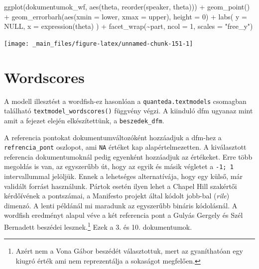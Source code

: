 \documentclass[
]{book}
\newenvironment{Shaded}{\begin{snugshade}}{\end{snugshade}}
\newcommand{\AttributeTok}[1]{\textcolor[rgb]{0.77,0.63,0.00}{#1}}
\newcommand{\ConstantTok}[1]{\textcolor[rgb]{0.00,0.00,0.00}{#1}}
\newcommand{\DecValTok}[1]{\textcolor[rgb]{0.00,0.00,0.81}{#1}}
\newcommand{\FunctionTok}[1]{\textcolor[rgb]{0.00,0.00,0.00}{#1}}
\newcommand{\NormalTok}[1]{#1}
\newcommand{\SpecialCharTok}[1]{\textcolor[rgb]{0.00,0.00,0.00}{#1}}
\newcommand{\StringTok}[1]{\textcolor[rgb]{0.31,0.60,0.02}{#1}}
\begin{document}
\begin{Shaded}
\begin{Highlighting}[]
\FunctionTok{ggplot}\NormalTok{(dokumentumok\_wf, }\FunctionTok{aes}\NormalTok{(theta, }\FunctionTok{reorder}\NormalTok{(speaker, theta))) }\SpecialCharTok{+}
  \FunctionTok{geom\_point}\NormalTok{() }\SpecialCharTok{+}
  \FunctionTok{geom\_errorbarh}\NormalTok{(}\FunctionTok{aes}\NormalTok{(}\AttributeTok{xmin =}\NormalTok{ lower, }\AttributeTok{xmax =}\NormalTok{ upper), }\AttributeTok{height =} \DecValTok{0}\NormalTok{) }\SpecialCharTok{+}
  \FunctionTok{labs}\NormalTok{(}
    \AttributeTok{y =} \ConstantTok{NULL}\NormalTok{,}
    \AttributeTok{x =} \FunctionTok{expression}\NormalTok{(theta)}
\NormalTok{  ) }\SpecialCharTok{+}
  \FunctionTok{facet\_wrap}\NormalTok{(}\SpecialCharTok{\textasciitilde{}}\NormalTok{part, }\AttributeTok{ncol =} \DecValTok{1}\NormalTok{, }\AttributeTok{scales =} \StringTok{"free\_y"}\NormalTok{)}
\end{Highlighting}
\end{Shaded}

\begin{center}\texttt{[image: \_main\_files/figure-latex/unnamed-chunk-151-1]} \end{center}

\hypertarget{wordscores}{%
\section{Wordscores}\label{wordscores}}

A modell illesztést a wordfish-ez hasonlóan a
\texttt{quanteda.textmodels} csomagban található
\texttt{textmodel\_wordscores()} függvény végzi. A kiinduló dfm ugyanaz
mint amit a fejezet elején elkészítettünk, a \texttt{beszedek\_dfm}.

A referencia pontokat dokumentumváltozóként hozzáadjuk a dfm-hez a
\texttt{refrencia\_pont} oszlopot, ami \texttt{NA} értéket kap
alapértelmezetten. A kiválasztott referencia dokumentumoknál pedig
egyenként hozzáadjuk az értékeket. Erre több megoldás is van, az
egyszerűbb út, hogy az egyik és másik végletet a \texttt{-1;\ 1}
intervallummal jelöljük. Ennek a lehetséges alternatívája, hogy egy
külső, már validált forrást használunk. Pártok esetén ilyen lehet a
Chapel Hill szakértői kérdőívének a pontszámai, a Manifesto projekt
által kódolt jobb-bal (\emph{rile}) dimenzó. A lenti példánál mi
maradunk az egyszerűbb bináris kódolásnál. A wordfish eredményt alapul
véve a két referencia pont a Gulyás Gergely és Szél Bernadett beszédei
lesznek.\footnote{Azért nem a Vona Gábor beszédét választottuk, mert az
  gyaníthatóan egy kiugró érték ami nem reprezentálja a sokaságot
  megfelően.} Ezek a 3. és 10. dokumentumok.
\end{document}
